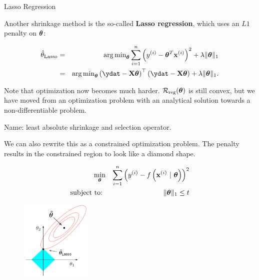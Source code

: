 
\begin{vbframe}{Lasso Regression}

Another shrinkage method is the so-called \textbf{Lasso regression}, which uses an $L1$ penalty on $\bm{\theta}$:

\begin{eqnarray*}
\thetah_{\text{Lasso}} &=&  \argmin_{\thetab} \sumin \left(\yi - \thetab^T \xi\right)^2 + \lambda \|\thetab\|_1 \\
  &=& \argmin_{\thetab} \left(\ydat - \Xmat \thetab\right)^\top \left(\ydat - \Xmat \thetab\right) + \lambda \|\thetab\|_1.
\end{eqnarray*}

Note that optimization now becomes much harder. $\mathcal{R}_{\text{reg}}(\bm{\theta})$ is still convex, but we have moved from an optimization problem with an analytical solution towards a non-differentiable problem.

\lz

Name: least absolute shrinkage and selection operator.

\framebreak

We can also rewrite this as a constrained optimization problem. The penalty results in the constrained region to look like a diamond shape.

\begin{eqnarray*}
\min_{\bm{\theta}} && \sum\limits_{i=1}^n \left(y^{(i)} - f\left(\mathbf{x}^{(i)} ~|~ \bm{\theta}\right)\right)^2\\
\text{subject to: } && \|\bm{\theta}\|_1 \leq t \\
\end{eqnarray*}

\vspace*{-1cm}

  \begin{figure}
\includegraphics[width=0.3\textwidth]{figure_man/lasso_hat.png}\\
\end{figure}

\end{vbframe}


\endlecture

